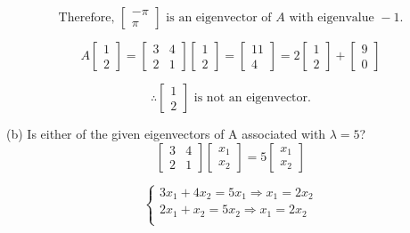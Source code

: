 \documentclass{article} %
\begin{document}
{    \[
        \text{Therefore, } \begin{bmatrix} -\pi \\ \pi \end{bmatrix} \text{ is an eigenvector of } A \text{ with eigenvalue } -1.
    \]

    \[
        A \begin{bmatrix} 1 \\ 2 \end{bmatrix}
        = \begin{bmatrix} 3 & 4 \\ 2 & 1 \end{bmatrix}
        \begin{bmatrix} 1 \\ 2 \end{bmatrix}
        = \begin{bmatrix} 11 \\ 4 \end{bmatrix}
        = 2 \begin{bmatrix} 1 \\ 2 \end{bmatrix}
        + \begin{bmatrix} 9 \\ 0 \end{bmatrix}
    \]

    \[
        \therefore \begin{bmatrix} 1 \\ 2 \end{bmatrix} \text{ is not an eigenvector.}
    \]

    \noindent (b) Is either of the given eigenvectors of A associated with $ \lambda = 5 $?
    \[
        \begin{bmatrix}
        3 & 4 \\
        2 & 1 
        \end{bmatrix}
        \begin{bmatrix}
        x_1 \\
        x_2 
        \end{bmatrix}
        =
        5
        \begin{bmatrix}
        x_1 \\
        x_2 
        \end{bmatrix}
    \]

    \[
        \begin{cases}
        3x_1 + 4x_2 = 5x_1 \Rightarrow x_1 = 2x_2 \\
        2x_1 + x_2 = 5x_2 \Rightarrow x_1 = 2x_2 \\
        \end{cases}
    \]

}
\end{document}
